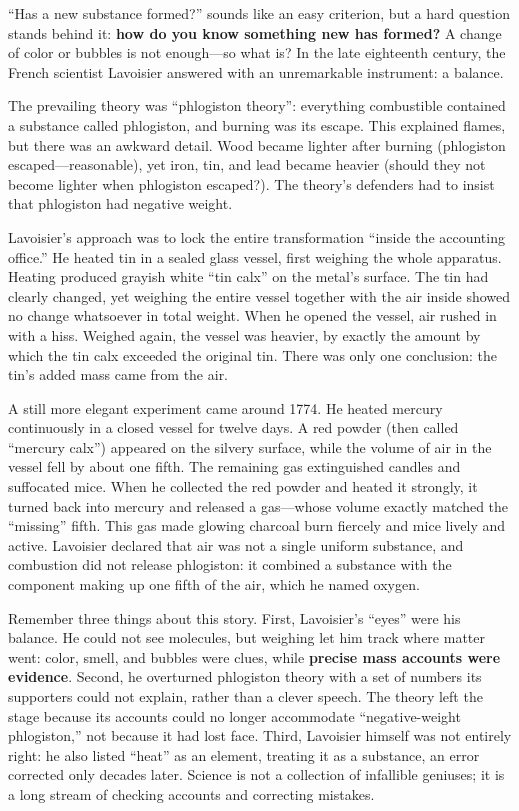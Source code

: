 \begin{zhengju}
``Has a new substance formed?'' sounds like an easy criterion, but a hard question stands behind it: \textbf{how do you know something new has formed?} A change of color or bubbles is not enough---so what is? In the late eighteenth century, the French scientist Lavoisier answered with an unremarkable instrument: a balance.

The prevailing theory was ``phlogiston theory'': everything combustible contained a substance called phlogiston, and burning was its escape. This explained flames, but there was an awkward detail. Wood became lighter after burning (phlogiston escaped---reasonable), yet iron, tin, and lead became heavier (should they not become lighter when phlogiston escaped?). The theory's defenders had to insist that phlogiston had negative weight.

Lavoisier's approach was to lock the entire transformation ``inside the accounting office.'' He heated tin in a sealed glass vessel, first weighing the whole apparatus. Heating produced grayish white ``tin calx'' on the metal's surface. The tin had clearly changed, yet weighing the entire vessel together with the air inside showed no change whatsoever in total weight. When he opened the vessel, air rushed in with a hiss. Weighed again, the vessel was heavier, by exactly the amount by which the tin calx exceeded the original tin. There was only one conclusion: the tin's added mass came from the air.

A still more elegant experiment came around 1774. He heated mercury continuously in a closed vessel for twelve days. A red powder (then called ``mercury calx'') appeared on the silvery surface, while the volume of air in the vessel fell by about one fifth. The remaining gas extinguished candles and suffocated mice. When he collected the red powder and heated it strongly, it turned back into mercury and released a gas---whose volume exactly matched the ``missing'' fifth. This gas made glowing charcoal burn fiercely and mice lively and active. Lavoisier declared that air was not a single uniform substance, and combustion did not release phlogiston: it combined a substance with the component making up one fifth of the air, which he named oxygen.

Remember three things about this story. First, Lavoisier's ``eyes'' were his balance. He could not see molecules, but weighing let him track where matter went: color, smell, and bubbles were clues, while \textbf{precise mass accounts were evidence}. Second, he overturned phlogiston theory with a set of numbers its supporters could not explain, rather than a clever speech. The theory left the stage because its accounts could no longer accommodate ``negative-weight phlogiston,'' not because it had lost face. Third, Lavoisier himself was not entirely right: he also listed ``heat'' as an element, treating it as a substance, an error corrected only decades later. Science is not a collection of infallible geniuses; it is a long stream of checking accounts and correcting mistakes.
\end{zhengju}

